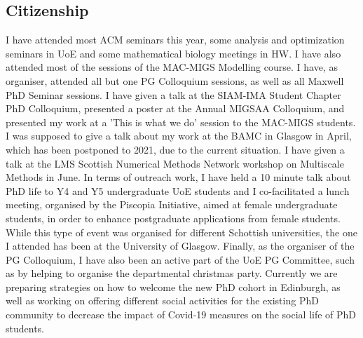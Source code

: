\documentclass[11pt, a4paper]{article}
\theoremstyle{definition}
\begin{document}
\subsection{Citizenship}
I have attended most ACM seminars this year, some analysis and optimization seminars in UoE and some mathematical biology meetings in HW. I have also attended most of the sessions of the MAC-MIGS Modelling course. I have, as organiser, attended all but one PG Colloquium sessions, as well as all Maxwell PhD Seminar sessions.
I have given a talk at the SIAM-IMA Student Chapter PhD Colloquium, presented a poster at the Annual MIGSAA Colloquium, and presented my work at a 'This is what we do' session to the MAC-MIGS students. I was supposed to give a talk about my work at the BAMC in Glasgow in April, which has been postponed to 2021, due to the current situation. I have given a talk at the LMS Scottish Numerical Methods Network workshop on Multiscale Methods in June. In terms of outreach work, I have held a 10 minute talk about PhD life to Y4 and Y5 undergraduate UoE students and I co-facilitated a lunch meeting, organised by the Piscopia Initiative, aimed at female undergraduate students, in order to enhance postgraduate applications from female students. While this type of event was organised for different Schottish universities, the one I attended has been at the University of Glasgow.
Finally, as the organiser of the PG Colloquium, I have also been an active part of the UoE PG Committee, such as by helping to organise the departmental christmas party. Currently we are preparing strategies on how to welcome the new PhD cohort in Edinburgh, as well as working on offering different social activities for the existing PhD community to decrease the impact of Covid-19 measures on the social life of PhD students.
\end{document}
